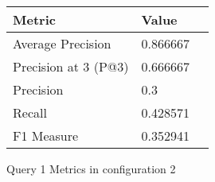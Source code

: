 \begin{figure}[H]
\begin{center}
\begin{tabular}{lll}
\toprule
{}                      Metric &         Value \\
\midrule
     Average Precision &  0.866667 \\
  Precision at 3 (P@3) &  0.666667 \\
             Precision &       0.3 \\
                Recall &  0.428571 \\
            F1 Measure &  0.352941 \\
\bottomrule
\end{tabular}
\end{center}
\caption{Query 1 Metrics in configuration 2}
\label{fig:query_1_metrics_config_2}
\end{figure}